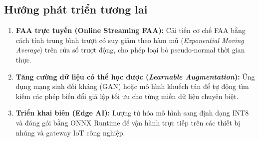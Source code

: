 \documentclass[sigconf,nonacm]{acmart}
\begin{document}
\subsection{Hướng phát triển tương lai}

\begin{enumerate}[leftmargin=*, itemsep=2pt, parsep=0pt]
    \item \textbf{FAA trực tuyến (Online Streaming FAA):} Cải tiến cơ chế FAA bằng cách tính trung bình trượt có suy giảm theo hàm mũ (\textit{Exponential Moving Average}) trên cửa sổ trượt động, cho phép loại bỏ pseudo-normal thời gian thực.
    \item \textbf{Tăng cường dữ liệu có thể học được (\textit{Learnable Augmentation}):} Ứng dụng mạng sinh đối kháng (GAN) hoặc mô hình khuếch tán để tự động tìm kiếm các phép biến đổi giả lập tối ưu cho từng miền dữ liệu chuyên biệt.
    \item \textbf{Triển khai biên (Edge AI):} Lượng tử hóa mô hình sang định dạng INT8 và đóng gói bằng ONNX Runtime để vận hành trực tiếp trên các thiết bị nhúng và gateway IoT công nghiệp.
\end{enumerate}
\end{document}
